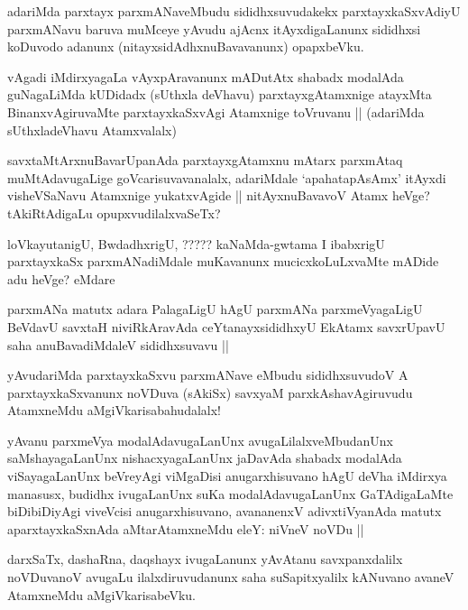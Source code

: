 \begin{artha}
adariMda parxtayx parxmANaveMbudu sididhxsuvudakekx parxtayxkaSxvAdiyU parxmANavu baruva muMceye yAvudu ajAcnx itAyxdigaLanunx sididhxsi koDuvodo adanunx (nitayxsidAdhxnuBavavanunx) opapxbeVku.
\end{artha}

\begin{artha}
vAgadi iMdirxyagaLa vAyxpAravanunx mADutAtx shabadx modalAda guNagaLiMda kUDidadx (sUthxla deVhavu) parxtayxgAtamxnige atayxMta BinanxvAgiruvaMte parxtayxkaSxvAgi Atamxnige toVruvanu || (adariMda sUthxladeVhavu Atamxvalalx)
\end{artha}

\begin{artha}
savxtaMtArxnuBavarUpanAda parxtayxgAtamxnu mAtarx parxmAtaq muMtAdavugaLige goVcarisuvavanalalx, adariMdale `apahatapAsAmx' itAyxdi visheVSaNavu Atamxnige yukatxvAgide || nitAyxnuBavavoV Atamx heVge? tAkiRtAdigaLu opupxvudilalxvaSeTx? 
\end{artha}

\begin{artha}
loVkayutanigU, BwdadhxrigU, {????? kaNaMda}-gwtama I ibabxrigU parxtayxkaSx parxmANadiMdale muKavanunx mucicxkoLuLxvaMte mADide adu heVge? eMdare
\end{artha}

\begin{artha}
parxmANa matutx adara PalagaLigU hAgU parxmANa parxmeVyagaLigU BeVdavU savxtaH niviRkAravAda ceYtanayxsididhxyU EkAtamx savxrUpavU saha anuBavadiMdaleV sididhxsuvavu ||
\end{artha}

\begin{artha}
yAvudariMda parxtayxkaSxvu parxmANave eMbudu sididhxsuvudoV A parxtayxkaSxvanunx noVDuva (sAkiSx) savxyaM parxkAshavAgiruvudu AtamxneMdu aMgiVkarisabahudalalx! 
\end{artha}

\begin{artha}
yAvanu parxmeVya modalAdavugaLanUnx avugaLilalxveMbudanUnx saMshayagaLanUnx nishacxyagaLanUnx jaDavAda shabadx modalAda viSayagaLanUnx beVreyAgi viMgaDisi anugarxhisuvano hAgU deVha iMdirxya manasusx, budidhx ivugaLanUnx suKa modalAdavugaLanUnx GaTAdigaLaMte biDibiDiyAgi viveVcisi anugarxhisuvano, avananenxV adivxtiVyanAda matutx aparxtayxkaSxnAda aMtarAtamxneMdu eleY: niVneV noVDu ||
\end{artha}

\begin{artha}
darxSaTx, dashaRna, daqshayx ivugaLanunx yAvAtanu savxpanxdalilx noVDuvanoV avugaLu ilalxdiruvudanunx saha suSapitxyalilx kANuvano avaneV AtamxneMdu aMgiVkarisabeVku.
\end{artha}


